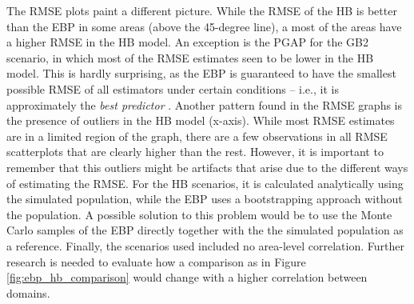 The RMSE plots paint a different picture.
While the RMSE of the HB is better than the EBP in some areas (above the 45-degree line), a most of the areas have a higher RMSE in the HB model.
An exception is the PGAP for the GB2 scenario, in which most of the RMSE estimates seen to be lower in the HB model.
This is hardly surprising, as the EBP is guaranteed to have the smallest possible RMSE of all estimators under certain conditions – i.e., it is approximately the \textit{best predictor} \citep{molina_small_2014}.
Another pattern found in the RMSE graphs is the presence of outliers in the HB model (x-axis).
While most RMSE estimates are in a limited region of the graph, there are a few observations in all RMSE scatterplots that are clearly higher than the rest.
However, it is important to remember that this outliers might be artifacts that arise due to the different ways of estimating the RMSE.
For the HB scenarios, it is calculated analytically using the simulated population, while the EBP uses a bootstrapping approach without the population.
A possible solution to this problem would be to use the Monte Carlo samples of the EBP directly together with the the simulated population as a reference.
Finally, the scenarios used included no area-level correlation.
Further research is needed to evaluate how a comparison as in Figure \ref{fig:ebp_hb_comparison} would change with a higher correlation between domains.

